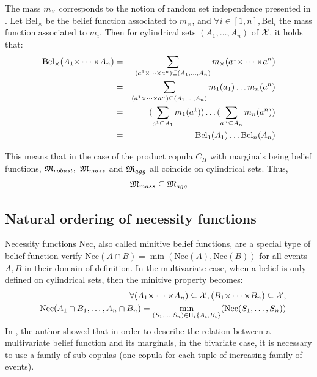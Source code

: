 The mass $m_\times$ corresponds to the notion of random set independence presented in \cite{couso_survey_2000}. Let $\mathrm{Bel}_\times$ be the belief function associated to $m_\times$, and $\forall i\in[1,n], \mathrm{Bel}_i$ the mass function associated to $m_i$. Then for cylindrical sets $(A_1, \dots, A_n)$ of ${\mathcal{X}}$, it holds that:
\begin{eqnarray}
    \mathrm{Bel}_\times(A_1{\times\dots\times} A_n) &=& \sum_{(a^1{\times\dots\times} a^n)\subseteq (A_1, \dots, A_n)}m_\times(a^1{\times\dots\times} a^n)\nonumber\\
    &=& \sum_{(a^1{\times\dots\times} a^n)\subseteq (A_1, \dots, A_n)}m_1(a_1)\dots m_n(a^n)\nonumber\\
    &=& (\sum_{a^1\subseteq A_1}m_1(a^1))\dots(\sum_{a^n\subseteq A_n}m_n(a^n))\nonumber\\
    &=& \mathrm{Bel}_1(A_1)\dots \mathrm{Bel}_n(A_n)
\end{eqnarray}

This means that in the case of the product copula $C_\Pi$ with marginals being belief functions, ${\mathfrak{M}}_{robust},~{\mathfrak{M}}_{mass}$ and ${\mathfrak{M}}_{agg}$ all coincide on cylindrical sets. Thus,
\begin{eqnarray*}
    {\mathfrak{M}}_{mass}\subseteq{\mathfrak{M}}_{agg}
\end{eqnarray*}

\subsection{Natural ordering of necessity functions}
Necessity functions $\mathrm{Nec}$, also called minitive belief functions, are a special type of belief function verify $\mathrm{Nec}(A\cap B) =\min(\mathrm{Nec}(A), \mathrm{Nec}(B))$ for all events $A, B$ in their domain of definition. In the multivariate case, when a belief is only defined on cylindrical sets, then the minitive property becomes:
\begin{eqnarray}
    &&\forall (A_1{\times\dots\times} A_n)\subseteq{\mathcal{X}}, (B_1{\times\dots\times} B_n)\subseteq{\mathcal{X}},\nonumber\\
    &&\mathrm{Nec}(A_1\cap B_1,\dots, A_n\cap B_n) = \min_{(S_1,\dots,S_n)\in\Pi_i\{A_i,B_i\}}(\mathrm{Nec}(S_1, \dots, S_n))
\end{eqnarray}
In \cite{schmelzer_joint_2015}, the author showed that in order to describe the relation between a multivariate belief function and its marginals, in the bivariate case, it is necessary to use a family of sub-copulas (one copula for each tuple of increasing family of events).

